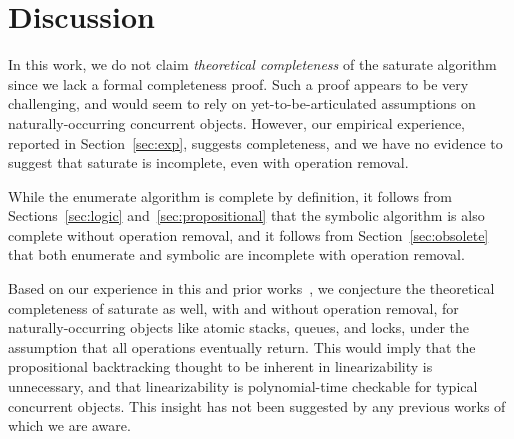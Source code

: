 \section{Discussion}
\label{sec:discussion}

In this work, we do not claim \emph{theoretical completeness} of the {\sc
saturate} algorithm since we lack a formal completeness proof. Such a proof
appears to be very challenging, and would seem to rely on yet-to-be-articulated
assumptions on naturally-occurring concurrent objects. However, our empirical
experience, reported in Section~\ref{sec:exp}, suggests completeness, and we
have no evidence to suggest that {\sc saturate} is incomplete, even with
operation removal.

While the {\sc enumerate} algorithm is complete by definition, it follows from
Sections~\ref{sec:logic} and~\ref{sec:propositional} that the {\sc symbolic}
algorithm is also complete without operation removal, and it follows from
Section~\ref{sec:obsolete} that both {\sc enumerate} and {\sc symbolic} are
incomplete with operation removal.

Based on our experience in this and prior works~\cite{ conf/esop/BouajjaniEEH13,
conf/popl/BouajjaniEEH15}, we conjecture the theoretical completeness of {\sc
saturate} as well, with and without operation removal, for naturally-occurring
objects like atomic stacks, queues, and locks, under the assumption that all
operations eventually return. This would imply that the propositional
backtracking thought to be inherent in linearizability is unnecessary, and that
linearizability is polynomial-time checkable for typical concurrent objects.
This insight has not been suggested by any previous works of which we are aware.
